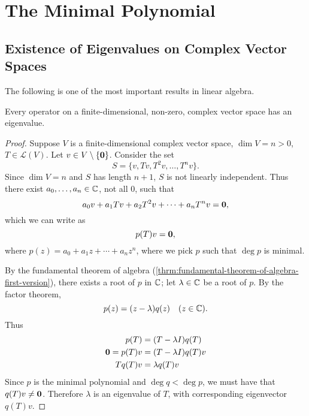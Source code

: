 \section{The Minimal Polynomial}
\subsection{Existence of Eigenvalues on Complex Vector Spaces}
The following is one of the most important results in linear algebra.

\begin{theorem}\label{thrm:existence-eigenvalues-complex-vector-spaces}
Every operator on a finite-dimensional, non-zero, complex vector space has an eigenvalue.
\end{theorem}

\begin{proof}
Suppose $V$ is a finite-dimensional complex vector space, $\dim V=n>0$, $T\in\mathcal{L}(V)$. Let $v\in V\setminus\{\vb{0}\}$. Consider the set
\[S=\{v,Tv,T^2v,\dots,T^nv\}.\]
Since $\dim V=n$ and $S$ has length $n+1$, $S$ is not linearly independent. Thus there exist $a_0,\dots,a_n\in\mathbb C$, not all $0$, such that
\[a_0v+a_1Tv+a_2T^2v+\cdots+a_nT^nv=\vb{0},\]
which we can write as
\[p(T)v=\vb{0},\]
where $p(z)=a_0+a_1z+\cdots+a_nz^n$, where we pick $p$ such that $\deg p$ is minimal.

By the fundamental theorem of algebra (\ref{thrm:fundamental-theorem-of-algebra-first-version}), there exists a root of $p$ in $\mathbb C$; let $\lambda\in\mathbb C$ be a root of $p$. By the factor theorem,
\[p(z)=(z-\lambda)q(z)\quad(z\in\mathbb C).\]
Thus
\begin{align*}
p(T)&=(T-\lambda I)q(T)\\
\vb{0}=p(T)v&=(T-\lambda I)q(T)v\\
Tq(T)v&=\lambda q(T)v
\end{align*}
Since $p$ is the minimal polynomial and $\deg q<\deg p$, we must have that $q(T)v\neq\vb{0}$. Therefore $\lambda$ is an eigenvalue of $T$, with corresponding eigenvector $q(T)v$.
\end{proof}

